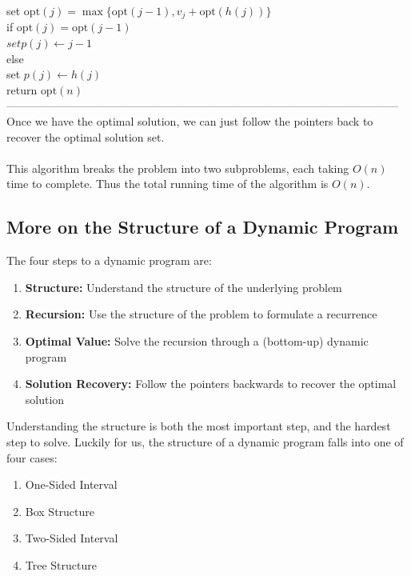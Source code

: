 \documentclass{article}
\newcommand{\tb}[1]{\textbf{#1}}
\newcommand{\opt}{\text{opt}}
\begin{document}
	\hspace*{14mm} set $\opt(j) = \max\{\opt(j-1), v_j + \opt(h(j))\}$\\
	\hspace*{14mm} if $\opt(j) = \opt(j-1)$\\
	\hspace*{21mm} $set p(j) \leftarrow j-1$\\
	\hspace*{14mm} else\\
	\hspace*{21mm} set $p(j) \leftarrow h(j)$\\
	\hspace*{7mm} return $\opt(n)$\\
---------------------------------------------------------------------------------------------------------\\
Once we have the optimal solution, we can just follow the pointers back to recover the optimal solution set.\\\\
This algorithm breaks the problem into two subproblems, each taking $O(n)$ time to complete. Thus the total running time of the algorithm is $O(n)$.
\subsection{More on the Structure of a Dynamic Program}
The four steps to a dynamic program are:
\begin{enumerate}
	\item \tb{Structure:} Understand the structure of the underlying problem
	\item \tb{Recursion:} Use the structure of the problem to formulate a recurrence
	\item \tb{Optimal Value:} Solve the recursion through a (bottom-up) dynamic program
	\item \tb{Solution Recovery:} Follow the pointers backwards to recover the optimal solution
\end{enumerate}
Understanding the structure is both the most important step, and the hardest step to solve. Luckily for us, the structure of a dynamic program falls into one of four cases:
\begin{enumerate}
	\item One-Sided Interval
	\item Box Structure
	\item Two-Sided Interval
	\item Tree Structure
\end{enumerate}
\end{document}

